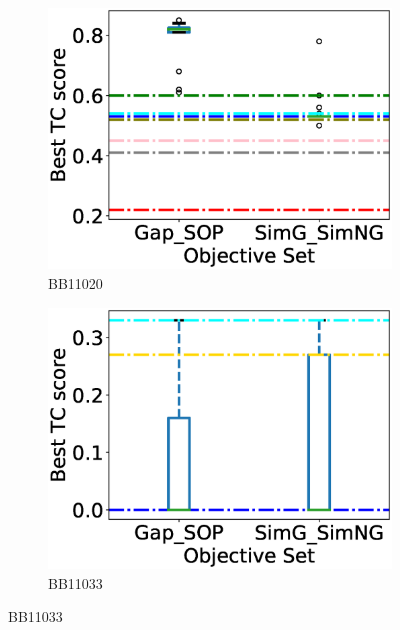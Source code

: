 \begin{figure}[!htbp]
\begin{adjustwidth}{-1cm}{-1cm}
\begin{subfigure}{0.26\textwidth}
			\includegraphics[width=\columnwidth]{Figure/summary/precomputedInit/Balibase/BB11020_objset_tc_rank_2}
			\caption{BB11020}
\end{subfigure}
\begin{subfigure}{0.26\textwidth}
			\includegraphics[width=\columnwidth]{Figure/summary/precomputedInit/Balibase/BB11033_objset_tc_rank_2}
			\caption{BB11033}
\end{subfigure}
		

\end{adjustwidth}
\end{figure}
